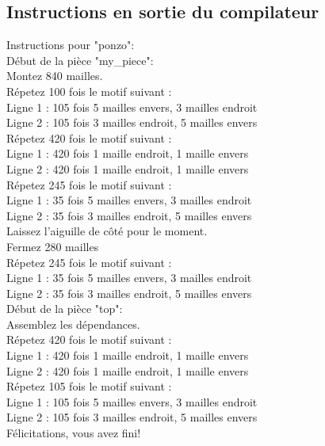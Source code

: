 \documentclass{article}
\begin{document}



\subsection{Instructions en sortie du compilateur}

\setlength{\parindent}{0cm}

Instructions pour "ponzo":\\

Début de la pièce "my\_piece":\\
Montez 840 mailles.\\

Répetez 100 fois le motif suivant :\\
Ligne 1 : 105 fois 5 mailles envers, 3 mailles endroit\\
Ligne 2 : 105 fois 3 mailles endroit, 5 mailles envers\\


Répetez 420 fois le motif suivant :\\
Ligne 1 : 420 fois 1 maille endroit, 1 maille envers\\
Ligne 2 : 420 fois 1 maille endroit, 1 maille envers\\


Répetez 245 fois le motif suivant :\\
Ligne 1 : 35 fois 5 mailles envers, 3 mailles endroit\\
Ligne 2 : 35 fois 3 mailles endroit, 5 mailles envers\\

Laissez l'aiguille de côté pour le moment.\\
Fermez 280 mailles\\

Répetez 245 fois le motif suivant :\\
Ligne 1 : 35 fois 5 mailles envers, 3 mailles endroit\\
Ligne 2 : 35 fois 3 mailles endroit, 5 mailles envers\\


Début de la pièce "top":\\
Assemblez les dépendances.\\

Répetez 420 fois le motif suivant :\\
Ligne 1 : 420 fois 1 maille endroit, 1 maille envers\\
Ligne 2 : 420 fois 1 maille endroit, 1 maille envers\\


Répetez 105 fois le motif suivant :\\
Ligne 1 : 105 fois 5 mailles envers, 3 mailles endroit\\
Ligne 2 : 105 fois 3 mailles endroit, 5 mailles envers\\


Félicitations, vous avez fini!
\end{document}
